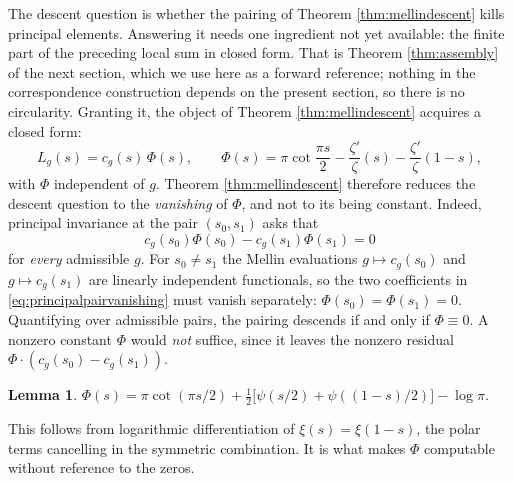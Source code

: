 \documentclass[11pt]{amsart}
\newtheorem{lemma}[theorem]{Lemma}
\theoremstyle{definition}
\theoremstyle{remark}
\begin{document}
The descent question is whether the pairing of Theorem \ref{thm:mellindescent}
kills principal elements.  Answering it needs one ingredient not yet
available: the finite part of the preceding local sum in closed form.  That
is Theorem \ref{thm:assembly} of the next section, which we use here as a
forward reference; nothing in the correspondence construction depends on the present section, so
there is no circularity.  Granting it, the object of Theorem
\ref{thm:mellindescent} acquires a closed form:
\begin{equation}\label{eq:Lg}
 L_g(s)=c_g(s)\,\Phi(s),
 \qquad
 \Phi(s)=\pi\cot\frac{\pi s}{2}-\frac{\zeta'}{\zeta}(s)
 -\frac{\zeta'}{\zeta}(1-s),
\end{equation}
with $\Phi$ independent of $g$.  Theorem \ref{thm:mellindescent} therefore
reduces the descent question to the \emph{vanishing} of $\Phi$, and not to its
being constant.  Indeed, principal invariance at the pair $(s_0,s_1)$ asks that
\begin{equation}\label{eq:principalpairvanishing}
 c_g(s_0)\Phi(s_0)-c_g(s_1)\Phi(s_1)=0
\end{equation}
for \emph{every} admissible $g$.  For $s_0\ne s_1$ the Mellin evaluations
$g\mapsto c_g(s_0)$ and $g\mapsto c_g(s_1)$ are linearly independent
functionals, so the two coefficients in \eqref{eq:principalpairvanishing} must
vanish separately: $\Phi(s_0)=\Phi(s_1)=0$.  Quantifying over admissible pairs,
the pairing descends if and only if $\Phi\equiv0$.  A nonzero constant $\Phi$
would \emph{not} suffice, since it leaves the nonzero residual
$\Phi\cdot(c_g(s_0)-c_g(s_1))$.

\begin{lemma}\label{lem:phipsi}
$\Phi(s)=\pi\cot(\pi s/2)+\tfrac12\big[\psi(s/2)+\psi((1-s)/2)\big]-\log\pi$.
\end{lemma}

This follows from logarithmic differentiation of $\xi(s)=\xi(1-s)$, the polar
terms cancelling in the symmetric combination.  It is what makes $\Phi$
computable without reference to the zeros.
\end{document}
